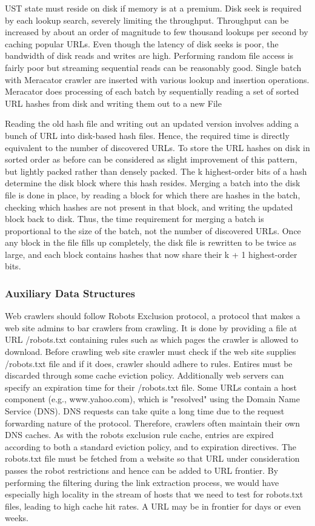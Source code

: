 \documentclass[article,type=msc,colorback,accentcolor=tud9c,twoside,11pt]{tudthesis}
\begin{document}
UST state must reside on disk if memory is at a premium. Disk seek is required by each lookup search, severely limiting the throughput. Throughput can be increased by about an order of magnitude\cite{Graphstructure} to few thousand lookups per second by caching popular URLs. Even though the latency of disk seeks is poor, the bandwidth of disk reads and writes are high. Performing random file access is fairly poor but streaming sequential reads can be reasonably good. Single batch with Meracator crawler are inserted with various lookup and insertion operations. Meracator does processing of each batch by sequentially reading a set of sorted URL hashes from disk and writing them out to a new File\cite{Highperformancewebcrawling}

Reading the old hash file and writing out an updated version involves adding a bunch of URL into disk-based hash files. Hence, the required time is directly equivalent to the number of discovered URLs. To store the URL hashes on disk in sorted order as before can be considered as slight improvement of this pattern, but lightly packed rather than densely packed. The k highest-order bits of a hash determine the disk block where this hash resides. Merging a batch into the disk file is done in place, by reading a block for which there are hashes in the batch, checking which hashes are not present in that block, and writing the updated block back to disk. Thus, the time requirement for merging a batch is proportional to the size of the batch, not the number of discovered URLs. Once any block in the file fills up completely, the disk file is rewritten to be twice as large, and each block contains hashes that now share their k + 1 highest-order bits.

\subsubsection{Auxiliary Data Structures}
Web crawlers should follow Robots Exclusion protocol, a protocol that makes a web site admins to bar crawlers from crawling. It is done by providing a file at URL /robots.txt containing rules such as which pages the crawler is allowed to download. Before crawling web site crawler must check if the web site supplies /robots.txt file and if it does, crawler should adhere to rules. Entires must be discarded through some cache eviction policy. Additionally web servers can specify an expiration time for their /robots.txt file. Some URLs contain a host component (e.g., www.yahoo.com), which is "resolved" using the Domain Name Service (DNS). DNS requests can take quite a long time due to the request forwarding nature of the protocol. Therefore, crawlers often maintain their own DNS caches. As with the robots exclusion rule cache, entries are expired according to both a standard eviction policy, and to expiration directives. The robots.txt file must be fetched from a website so that URL under consideration passes the robot restrictions and hence can be added to URL frontier. By performing the filtering during the link extraction process, we would have especially high locality in the stream of hosts that we need to test for robots.txt files, leading to high cache hit rates. A URL may be in frontier for days or even weeks.
 
\end{document}
